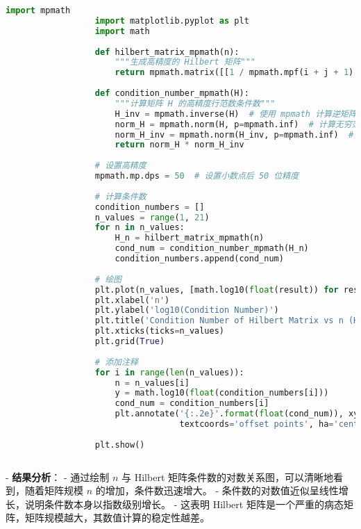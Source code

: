 \documentclass{article}
\begin{document}
\begin{enumerate}[itemsep=1em]
            \begin{lstlisting}[language=Python]
                  import mpmath
                  import matplotlib.pyplot as plt
                  import math
                  
                  def hilbert_matrix_mpmath(n):
                      """生成高精度的 Hilbert 矩阵"""
                      return mpmath.matrix([[1 / mpmath.mpf(i + j + 1) for j in range(n)] for i in range(n)])
                  
                  def condition_number_mpmath(H):
                      """计算矩阵 H 的高精度行范数条件数"""
                      H_inv = mpmath.inverse(H)  # 使用 mpmath 计算逆矩阵
                      norm_H = mpmath.norm(H, p=mpmath.inf)  # 计算无穷范数
                      norm_H_inv = mpmath.norm(H_inv, p=mpmath.inf)  # 计算逆矩阵的无穷范数
                      return norm_H * norm_H_inv
                  
                  # 设置高精度
                  mpmath.mp.dps = 50  # 设置小数点后 50 位精度
                  
                  # 计算条件数
                  condition_numbers = []
                  n_values = range(1, 21)
                  for n in n_values:
                      H_n = hilbert_matrix_mpmath(n)
                      cond_num = condition_number_mpmath(H_n)
                      condition_numbers.append(cond_num)
                  
                  # 绘图
                  plt.plot(n_values, [math.log10(float(result)) for result in condition_numbers], marker='o')
                  plt.xlabel('n')
                  plt.ylabel('log10(Condition Number)')
                  plt.title('Condition Number of Hilbert Matrix vs n (High Precision)')
                  plt.xticks(ticks=n_values)
                  plt.grid(True)
                  
                  # 添加注释
                  for i in range(len(n_values)):
                      n = n_values[i]
                      y = math.log10(float(condition_numbers[i]))
                      cond_num = condition_numbers[i]
                      plt.annotate('{:.2e}'.format(float(cond_num)), xy=(n, y), xytext=(0, 20),
                                   textcoords='offset points', ha='center', fontsize=8)
                  
                  plt.show()
                  
    \end{lstlisting}
            - \textbf{结果分析}：
            - 通过绘制 \( n \) 与 Hilbert 矩阵条件数的对数关系图，可以清晰地看到，随着矩阵规模 \( n \) 的增加，条件数迅速增大。
            - 条件数的对数值近似呈线性增长，说明条件数本身以指数级别增长。
            - 这表明 Hilbert 矩阵是一个严重的病态矩阵，矩阵规模越大，其数值计算的稳定性越差。


\end{enumerate}
\end{document}
